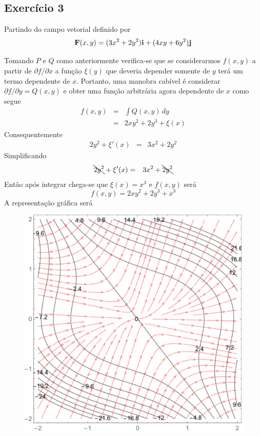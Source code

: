 \documentclass[a4paper, 12pt, brazilian]{article}
\begin{document}
	\subsection{Exercício 3}
	\noindent Partindo do campo vetorial definido por
	\begin{equation}
		\textbf{F} (x,y)=(3x^{2}+2y^{2})\textbf{i}+(4xy+6y^{2})\textbf{j}
	\end{equation}
	
	Tomando $P$ e $Q$ como anteriormente verifica-se que se considerarmos $f(x,y)$ a partir de $\partial f/\partial x$ a função $\xi(y)$ que deveria depender somente de $y$ terá um termo dependente de $x$. Portanto, uma manobra cabível é considerar $\partial f/\partial y=Q(x,y)$ e obter uma função arbitrária agora dependente de $x$ como segue	
	\begin{eqnarray}
		f(x,y)&=&\int Q(x,y)\,dy\\
		&=&2xy^{2}+2y^{3}+\xi(x)
	\end{eqnarray}
	Consequentemente
	\begin{eqnarray}
		2y^{2}+\xi'(x)&=&3x^{2}+2y^{2}
	\end{eqnarray}
	Simplificando
	\begin{eqnarray}
	\bcancel{2y^{2}}+\xi'(x)&=&3x^{2}+\bcancel{2y^{2}}
	\end{eqnarray}
	Então após integrar chega-se que $\xi(x)=x^{3}$ e $f(x,y)$ será
	\begin{equation}
		f(x,y)=2xy^{2}+2y^{3}+x^{3}
	\end{equation}
	A representação gráfica será
	\begin{figure}[H]
		\centering
		\includegraphics[width=0.7\linewidth]{images/g3}
		\label{fig:g3}
	\end{figure}
	
\end{document}
